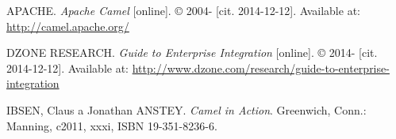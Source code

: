 \documentclass[12pt,final,oneside]{fithesis2}
\begin{document}



\begin{thebibliography}{}
	 APACHE. \textit{Apache Camel} [online]. \copyright{} 2004- [cit. 2014-12-12]. Available at: \url{http://camel.apache.org/}
	
		 DZONE RESEARCH. \textit{Guide to Enterprise Integration} [online]. \copyright{} 2014- [cit. 2014-12-12]. Available at: \url{http://www.dzone.com/research/guide-to-enterprise-integration}
	
	 IBSEN, Claus a Jonathan ANSTEY. \textit{Camel in Action}. Greenwich, Conn.: Manning, c2011, xxxi, ISBN 19-351-8236-6.
	
\end{thebibliography}

\endgroup
\appendix

\end{document}
